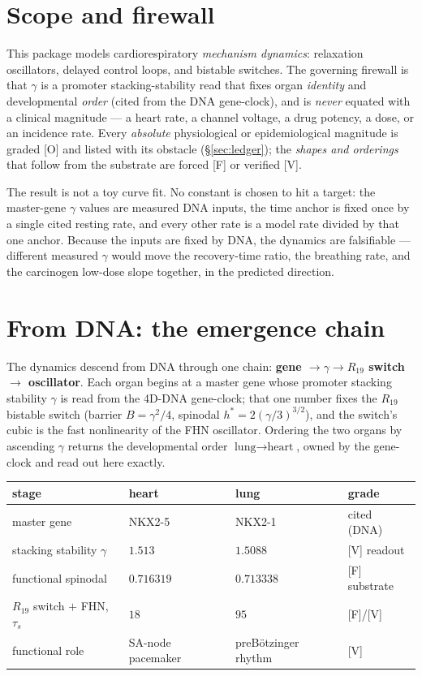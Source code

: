 \documentclass[11pt]{article}
\newcommand{\grade}[1]{\textsf{\small[#1]}}
\begin{document}
\section{Scope and firewall}

This package models cardiorespiratory \emph{mechanism dynamics}: relaxation oscillators, delayed
control loops, and bistable switches. The governing firewall is that $\gamma$ is a promoter
stacking-stability read that fixes organ \emph{identity} and developmental \emph{order} (cited from the
DNA gene-clock), and is \emph{never} equated with a clinical magnitude --- a heart rate, a channel
voltage, a drug potency, a dose, or an incidence rate. Every \emph{absolute} physiological or
epidemiological magnitude is graded \grade{O} and listed with its obstacle (\S\ref{sec:ledger}); the
\emph{shapes and orderings} that follow from the substrate are forced \grade{F} or verified \grade{V}.

The result is not a toy curve fit. No constant is chosen to hit a target: the master-gene $\gamma$
values are measured DNA inputs, the time anchor is fixed once by a single cited resting rate, and every
other rate is a model rate divided by that one anchor. Because the inputs are fixed by DNA, the
dynamics are falsifiable --- different measured $\gamma$ would move the recovery-time ratio, the
breathing rate, and the carcinogen low-dose slope together, in the predicted direction.

\section{From DNA: the emergence chain}\label{sec:dna}

The dynamics descend from DNA through one chain: \textbf{gene $\to\gamma\to R_{19}$ switch $\to$
oscillator}. Each organ begins at a master gene whose promoter stacking stability $\gamma$ is read from
the 4D-DNA gene-clock; that one number fixes the $R_{19}$ bistable switch (barrier $B=\gamma^2/4$,
spinodal $h^\ast=2(\gamma/3)^{3/2}$), and the switch's cubic is the fast nonlinearity of the FHN
oscillator. Ordering the two organs by ascending $\gamma$ returns the developmental order
$\text{lung}\to\text{heart}$, owned by the gene-clock and read out here exactly.

\begin{center}
\begin{tabular}{@{}llll@{}}
\toprule
stage & heart & lung & grade\\
\midrule
master gene & NKX2-5 & NKX2-1 & cited (DNA)\\
stacking stability $\gamma$ & $1.513$ & $1.5088$ & \grade{V} readout\\
functional spinodal & $0.716319$ & $0.713338$ & \grade{F} substrate\\
$R_{19}$ switch $+$ FHN, $\tau_s$ & $18$ & $95$ & \grade{F}/\grade{V}\\
functional role & SA-node pacemaker & preB\"otzinger rhythm & \grade{V}\\
\bottomrule
\end{tabular}
\end{center}
\end{document}

